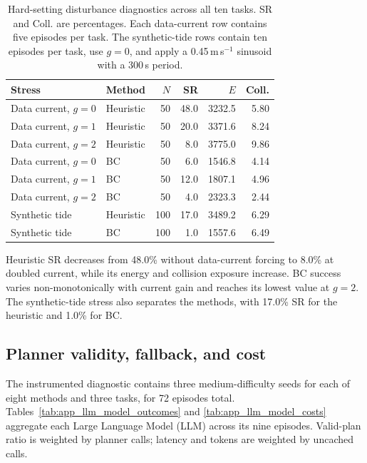 \begin{table}[!t]
\centering
\scriptsize
\setlength{\tabcolsep}{2pt}
\renewcommand{\arraystretch}{1.08}
\begin{tabularx}{\columnwidth}{@{}>{\raggedright\arraybackslash}X l r r r r@{}}
\toprule
\textbf{Stress} & \textbf{Method} & \textbf{$N$} & \textbf{SR} & \textbf{$E$} & \textbf{Coll.} \\
\midrule
Data current, $g=0$ & Heuristic & 50 & 48.0 & 3232.5 & 5.80 \\
Data current, $g=1$ & Heuristic & 50 & 20.0 & 3371.6 & 8.24 \\
Data current, $g=2$ & Heuristic & 50 & 8.0 & 3775.0 & 9.86 \\
Data current, $g=0$ & BC & 50 & 6.0 & 1546.8 & 4.14 \\
Data current, $g=1$ & BC & 50 & 12.0 & 1807.1 & 4.96 \\
Data current, $g=2$ & BC & 50 & 4.0 & 2323.3 & 2.44 \\
Synthetic tide & Heuristic & 100 & 17.0 & 3489.2 & 6.29 \\
Synthetic tide & BC & 100 & 1.0 & 1557.6 & 6.49 \\
\bottomrule
\end{tabularx}
\caption{Hard-setting disturbance diagnostics across all ten tasks. SR and Coll. are percentages. Each data-current row contains five episodes per task. The synthetic-tide rows contain ten episodes per task, use $g=0$, and apply a 0.45\,m\,s$^{-1}$ sinusoid with a 300\,s period.}
\label{tab:app_disturbance_stress}
\end{table}

Heuristic SR decreases from 48.0\% without data-current forcing to 8.0\% at doubled current, while its energy and collision exposure increase. BC success varies non-monotonically with current gain and reaches its lowest value at $g=2$. The synthetic-tide stress also separates the methods, with 17.0\% SR for the heuristic and 1.0\% for BC.

\subsection{Planner validity, fallback, and cost}

The instrumented diagnostic contains three medium-difficulty seeds for each of eight methods and three tasks, for 72 episodes total. Tables~\ref{tab:app_llm_model_outcomes} and \ref{tab:app_llm_model_costs} aggregate each Large Language Model (LLM) across its nine episodes. Valid-plan ratio is weighted by planner calls; latency and tokens are weighted by uncached calls.

